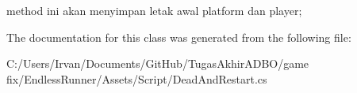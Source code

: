 method ini akan menyimpan letak awal platform dan player; 



The documentation for this class was generated from the following file\+:\begin{DoxyCompactItemize}
\item 
C\+:/\+Users/\+Irvan/\+Documents/\+Git\+Hub/\+Tugas\+Akhir\+A\+D\+B\+O/game fix/\+Endless\+Runner/\+Assets/\+Script/Dead\+And\+Restart.\+cs\end{DoxyCompactItemize}

